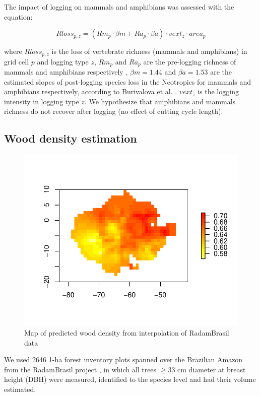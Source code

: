 \documentclass{article}
\begin{document}
The impact of logging on mammals and amphibians was assessed with the equation: 

\begin{equation}
\label{eq:rloss}
Rloss_{p,z} = \left(Rm_{p} \cdot \beta m + Ra_{p} \cdot \beta a  \right)  \cdot vext_z \cdot area_p 
\end{equation}

where $Rloss_{p,z}$ is the loss of vertebrate richness (mammals and amphibians) in grid cell $p$ and logging type $z$, $Rm_{p}$ and $Ra_p$ are the pre-logging richness of mammals and amphibians respectively \cite{Jenkins2013}, $\beta m = 1.44$ and $\beta a = 1.53$  are the estimated slopes of post-logging species loss in the Neotropics for mammals and amphibians respectively, according to Burivalova et al.  \cite{Burivalova2014}. $vext_z$ is the logging intensity in logging type $z$.
We hypothesize that amphibians and mammals richness do not recover after logging (no effect of cutting cycle length). 

\subsection{Wood density estimation}
\label{supmat:wdext}

\begin{figure}
    \centering
    \includegraphics[width=0.7\linewidth]{graphs/map_WDext.pdf}
    \caption{Map of predicted wood density from interpolation of RadamBrasil data}
    \label{sfig:wdext}
\end{figure}

We used 2646 1-ha forest inventory plots spanned over the Brazilian Amazon from the RadamBrasil project \cite{Radam2017}, in which all trees $\geq$33 cm diameter at breast height (DBH) were measured, identified to the species level and had their volume estimated. 
\end{document}
